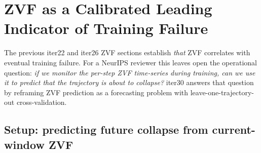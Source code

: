 %
%
%
%
%
%
%

\section{ZVF as a Calibrated Leading Indicator of Training Failure}
\label{sec:zvf-iter30}

The previous iter22 and iter26 ZVF sections establish \emph{that} ZVF
correlates with eventual training failure. For a NeurIPS reviewer
this leaves open the operational question: \emph{if we monitor the
per-step ZVF time-series during training, can we use it to predict
that the trajectory is about to collapse?} iter30 answers that
question by reframing ZVF prediction as a forecasting problem with
leave-one-trajectory-out cross-validation.

\subsection{Setup: predicting future collapse from current-window ZVF}
\label{sec:zvf-iter30-setup}


